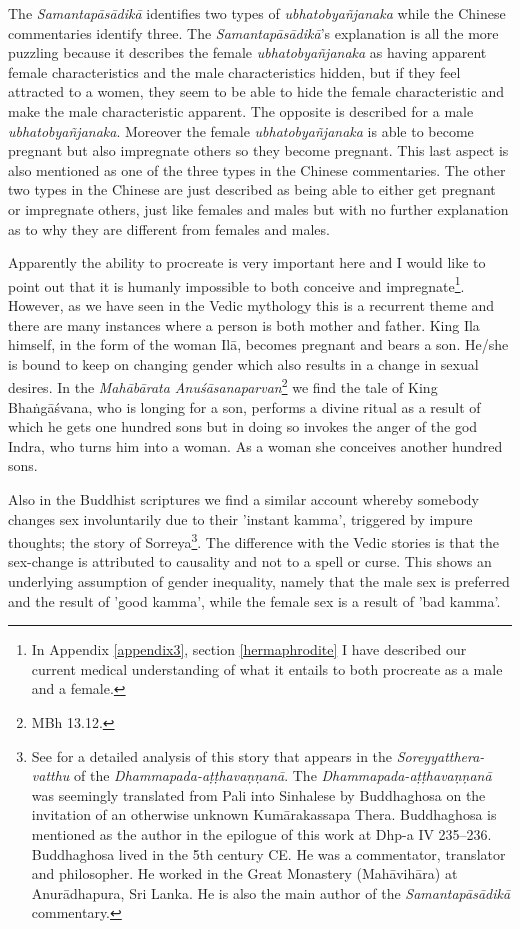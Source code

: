 The {\em Samantapāsādikā} identifies two types of {\em ubhatob­yañ­janaka} while the Chinese commentaries identify three. The {\em Samantapāsādikā}'s explanation is all the more puzzling because it describes the female {\em ubhatob­yañ­janaka} as having apparent female characteristics and the male characteristics hidden, but if they feel attracted to a women, they seem to be able to hide the female characteristic and make the male characteristic apparent. The opposite is described for a male {\em ubhatob­yañ­janaka}. Moreover the female {\em ubhatob­yañ­janaka} is able to become pregnant but also impregnate others so they become pregnant. This last aspect is also mentioned as one of the three types in the Chinese commentaries. The other two types in the Chinese are just described as being able to either get pregnant or impregnate others, just like females and males but with no further explanation as to why they are different from females and males. 

Apparently the ability to procreate is very important here and I would like to point out that it is humanly impossible to both conceive and impregnate\footnote{In Appendix \ref{appendix3}, section \ref{hermaphrodite} I have described our current medical understanding of what it entails to both procreate as a male and a female.}. However, as we have seen in the Vedic mythology this is a recurrent theme and there are many instances where a person is both mother and father. King Ila himself, in the form of the woman Ilā, becomes pregnant and bears a son. He/she is bound to keep on changing gender which also results in a change in sexual desires. In the {\em Mahābārata Anuśāsanaparvan}\footnote{MBh 13.12.} we find the tale of King Bhaṅgāśvana, who is longing for a son, performs a divine ritual as a result of which he gets one hundred sons but in doing so invokes the anger of the god Indra, who turns him into a woman. As a woman she conceives another hundred sons. 

Also in the Buddhist scriptures we find a similar account whereby somebody changes sex involuntarily due to their 'instant kamma', triggered by impure thoughts; the story of Sorreya\footnote{See \cite{dhammadinna} for a detailed analysis of this story that appears in the {\em Soreyyatthera-vatthu} of the {\em Dhammapada-aṭṭhavaṇṇanā}. The {\em Dhammapada-aṭṭhavaṇṇanā} was seemingly translated from Pali into Sinhalese by Buddhaghosa on the invitation of an otherwise unknown Kumārakassapa Thera. Buddhaghosa is mentioned as the author in the epilogue of this work at Dhp-a IV 235–236. Buddhaghosa lived in the 5th century CE. He was a commentator, translator and philosopher. He worked in the Great Monastery (Mahāvihāra) at Anurādhapura, Sri Lanka. He is also the main author of the {\em Samantapāsādikā} commentary.}. The difference with the Vedic stories is that the sex-change is attributed to causality and not to a spell or curse. This shows an underlying assumption of gender inequality, namely that the male sex is preferred and the result of 'good kamma', while the female sex is a result of 'bad kamma'.

